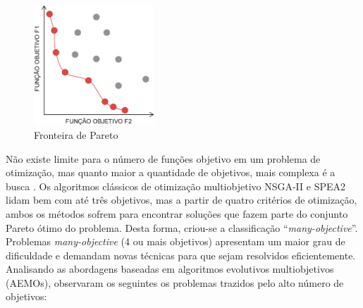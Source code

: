 \begin{figure}
	\centering
	\includegraphics[width=0.4\textwidth]{cap_otimizacao-multi/figs/pareto}
	\caption{\label{fig_pareto}Fronteira de Pareto}
\end{figure}

Não existe limite para o número de funções objetivo em um problema de otimização, mas quanto maior a quantidade de objetivos, mais complexa é a busca \cite{Deb2014}. Os algoritmos clássicos de otimização multiobjetivo \ac{NSGA-II} e \ac{SPEA2} lidam bem com até três objetivos, mas a partir de quatro critérios de otimização, ambos os métodos sofrem para encontrar soluções que fazem parte do conjunto Pareto ótimo do problema. Desta forma, criou-se a classificação ``\textit{many-objective}''. Problemas \textit{many-objective} (4 ou mais objetivos) apresentam um maior grau de dificuldade e demandam novas técnicas para que sejam resolvidos eficientemente. Analisando as abordagens baseadas em algoritmos evolutivos multiobjetivos (AEMOs),  observaram os seguintes os problemas trazidos pelo alto número de objetivos:

